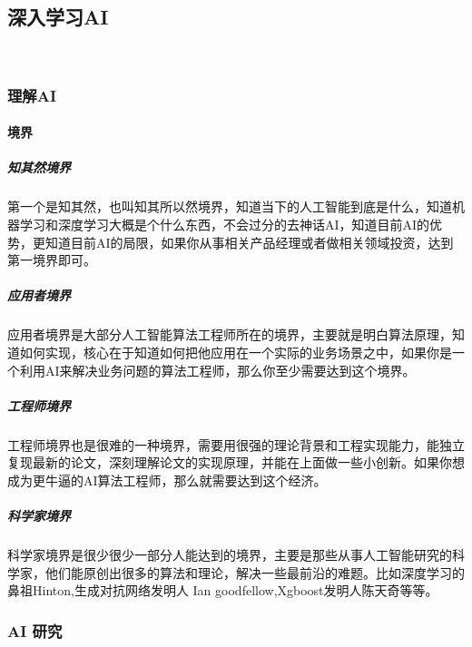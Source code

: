 \documentclass[letterpaper,10pt,english]{sphinxmanual}
\begin{document}


\subsection{深入学习AI}
\label{\detokenize{chapter_AI_dive/index:ai}}\label{\detokenize{chapter_AI_dive/index:chap-ai-dive}}\label{\detokenize{chapter_AI_dive/index::doc}}
​


\subsubsection{理解AI}
\label{\detokenize{chapter_AI_dive/understand_AI:ai}}\label{\detokenize{chapter_AI_dive/understand_AI::doc}}

\paragraph{境界}
\label{\detokenize{chapter_AI_dive/understand_AI:id1}}

\subparagraph{知其然境界}
\label{\detokenize{chapter_AI_dive/understand_AI:id2}}
第一个是知其然，也叫知其所以然境界，知道当下的人工智能到底是什么，知道机器学习和深度学习大概是个什么东西，不会过分的去神话AI，知道目前AI的优势，更知道目前AI的局限，如果你从事相关产品经理或者做相关领域投资，达到第一境界即可。


\subparagraph{应用者境界}
\label{\detokenize{chapter_AI_dive/understand_AI:id3}}
应用者境界是大部分人工智能算法工程师所在的境界，主要就是明白算法原理，知道如何实现，核心在于知道如何把他应用在一个实际的业务场景之中，如果你是一个利用AI来解决业务问题的算法工程师，那么你至少需要达到这个境界。


\subparagraph{工程师境界}
\label{\detokenize{chapter_AI_dive/understand_AI:id4}}
工程师境界也是很难的一种境界，需要用很强的理论背景和工程实现能力，能独立复现最新的论文，深刻理解论文的实现原理，并能在上面做一些小创新。如果你想成为更牛逼的AI算法工程师，那么就需要达到这个经济。


\subparagraph{科学家境界}
\label{\detokenize{chapter_AI_dive/understand_AI:id5}}
科学家境界是很少很少一部分人能达到的境界，主要是那些从事人工智能研究的科学家，他们能原创出很多的算法和理论，解决一些最前沿的难题。比如深度学习的鼻祖Hinton,生成对抗网络发明人
Ian goodfellow,Xgboost发明人陈天奇等等。


\subsubsection{AI 研究}
\label{\detokenize{chapter_AI_dive/AI_Research:ai}}\label{\detokenize{chapter_AI_dive/AI_Research::doc}}
\end{document}
